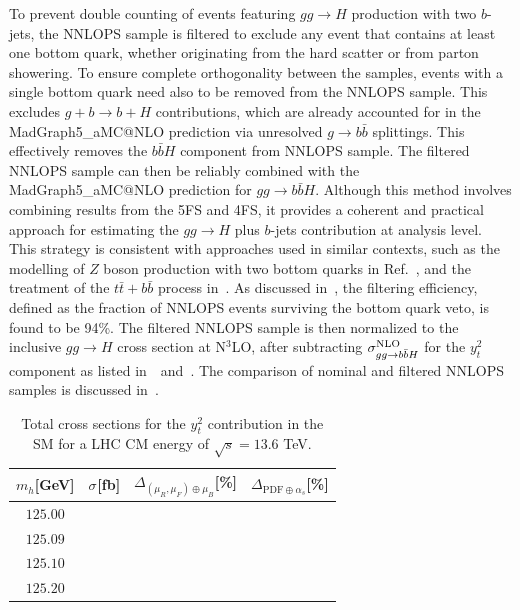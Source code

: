 \documentclass[11pt,a4paper]{article}
\begin{document}
To prevent double counting of events featuring $gg \to H$ production with two $b$-jets, the {\sc NNLOPS} sample is filtered to exclude any event that contains at least one bottom quark, whether originating from the hard scatter or from parton showering. To ensure complete orthogonality between the samples, events with a single bottom quark need also to be removed from the {\sc NNLOPS} sample. This excludes $g + b \to b + H$ contributions, which are already accounted for in the {\sc MadGraph5\_aMC@NLO} prediction via unresolved $g \to b\bar{b}$ splittings. This effectively removes the $b\bar{b}H$ component from {\sc NNLOPS} sample. The filtered {\sc NNLOPS} sample can then be reliably combined with the {\sc MadGraph5\_aMC@NLO} prediction for $gg \to b\bar{b}H$. Although this method involves combining results from the 5FS and 4FS, it provides a coherent and practical approach for estimating the $gg \to H$ plus $b$-jets contribution at analysis level. This strategy is consistent with approaches used in similar contexts, such as the modelling of $Z$ boson production with two bottom quarks in Ref.~\cite{bagnaschi:2018dnh}, and the treatment of the $t\bar{t}+b\bar{b}$ process in~.  As discussed in~\citere{}, the filtering efficiency, defined as the fraction of {\sc NNLOPS} events surviving the bottom quark veto, is found to be 94\%. The filtered {\sc NNLOPS} sample is then normalized to the inclusive $gg \to H$ cross section at N$^3$LO, after subtracting $\sigma_{gg \rightarrow b\bar{b}H}^{\text{NLO}}$ for the $y_t^2$ component as listed in~~and~. The comparison of nominal and filtered {\sc NNLOPS} samples is discussed in~.


\begin{table}[ht!]
\begin{center}%
\begin{small}%
\begin{tabular}{cccc}%
$m_h$[GeV] & $\sigma^{}$[fb] & $\Delta_{\left(\mu_{R},\mu_{F}\right)\oplus\mu_{B}}$[\%] & $\Delta_{\mathrm{PDF}\oplus\alpha_s}$[\%]  \\\hline
$125.00$  \\
$125.09$ \\
$125.10$  \\
$125.20$ \\
\end{tabular}%
\end{small}%
\end{center}%
\caption{Total \bbH{} cross sections for the $y_t^2$ contribution in the SM for a LHC CM energy of $\sqrt{s}=13.6$ TeV.}
\label{tab:bbHyt13p6}
\end{table}
\end{document}
